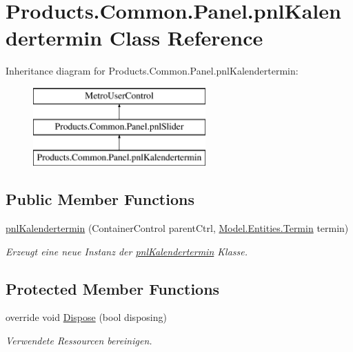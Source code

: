 \hypertarget{class_products_1_1_common_1_1_panel_1_1pnl_kalendertermin}{}\section{Products.\+Common.\+Panel.\+pnl\+Kalendertermin Class Reference}
\label{class_products_1_1_common_1_1_panel_1_1pnl_kalendertermin}
Inheritance diagram for Products.\+Common.\+Panel.\+pnl\+Kalendertermin\+:\begin{figure}[H]
\begin{center}
\leavevmode
\includegraphics[height=3.000000cm]{class_products_1_1_common_1_1_panel_1_1pnl_kalendertermin}
\end{center}
\end{figure}
\subsection*{Public Member Functions}
\begin{DoxyCompactItemize}
\item 
\hyperlink{class_products_1_1_common_1_1_panel_1_1pnl_kalendertermin_a73c18286ccd752eaad8be4df5dea8777}{pnl\+Kalendertermin} (Container\+Control parent\+Ctrl, \hyperlink{class_products_1_1_model_1_1_entities_1_1_termin}{Model.\+Entities.\+Termin} termin)
\begin{DoxyCompactList}\small\item\em Erzeugt eine neue Instanz der \hyperlink{class_products_1_1_common_1_1_panel_1_1pnl_kalendertermin}{pnl\+Kalendertermin} Klasse. \end{DoxyCompactList}\end{DoxyCompactItemize}
\subsection*{Protected Member Functions}
\begin{DoxyCompactItemize}
\item 
override void \hyperlink{class_products_1_1_common_1_1_panel_1_1pnl_kalendertermin_ae2a662e8eb7780a88dc8f851484cb848}{Dispose} (bool disposing)
\begin{DoxyCompactList}\small\item\em Verwendete Ressourcen bereinigen. \end{DoxyCompactList}\end{DoxyCompactItemize}
